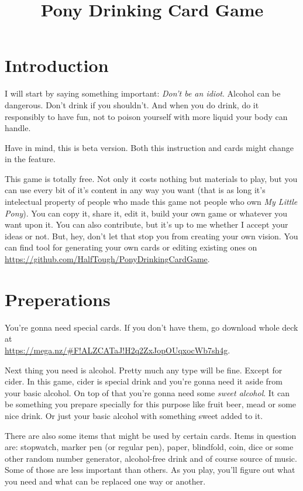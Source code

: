 \documentclass[notitlepage]{article}
\title{Pony Drinking Card Game}
\begin{document}
\maketitle
\section{Introduction}
I will start by saying something important: \textsl{Don't be an idiot}. Alcohol can be dangerous. Don't drink if you shouldn't. And when you do drink, do it responsibly to have fun, not to poison yourself with more liquid your body can handle.

Have in mind, this is beta version. Both this instruction and cards might change in the feature.

This game is totally free. Not only it costs nothing but materials to play, but you can use every bit of it's content in any way you want (that is as long it's intelectual property of people who made this game not people who own \textsl{My Little Pony}). You can copy it, share it, edit it, build your own game or whatever you want upon it. You can also contribute, but it's up to me whether I accept your ideas or not. But, hey, don't let that stop you from creating your own vision. You can find tool for generating your own cards or editing existing ones on \url{https://github.com/HalfTough/PonyDrinkingCardGame}.

\section{Preperations}
You're gonna need special cards. If you don't have them, go download whole deck at\\\url{https://mega.nz/#F!ALZCATaJ!H2q2ZxJopOUqxocWb7sh4g}.

Next thing you need is alcohol. Pretty much any type will be fine. Except for cider. In this game, cider is special drink and you're gonna need it aside from your basic alcohol. On top of that you're gonna need some \textsl{sweet alcohol}. It can be something you prepare specially for this purpose like fruit beer, mead or some nice drink. Or just your basic alcohol with something sweet added to it.

There are also some items that might be used by certain cards. Items in question are: stopwatch, marker pen (or regular pen), paper, blindfold, coin, dice or some other random number generator, alcohol-free drink and of course source of music. Some of those are less important than others. As you play, you'll figure out what you need and what can be replaced one way or another.
\end{document}
